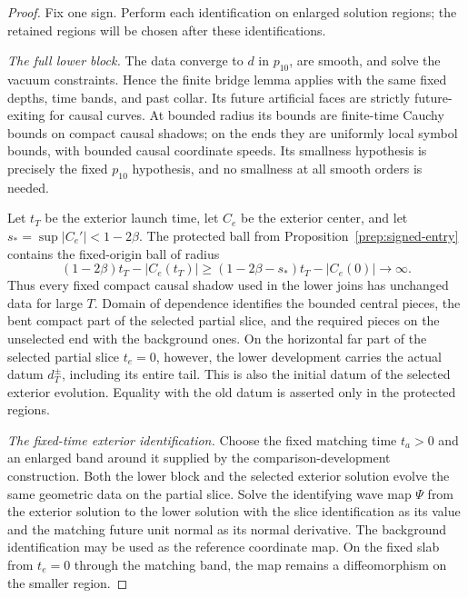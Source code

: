 \begin{proof}
Fix one sign. Perform each identification on enlarged solution regions;
the retained regions will be chosen after these identifications.

\emph{The full lower block.}
The data converge to $d$ in $p_{10}$, are smooth, and solve the
vacuum constraints. Hence the finite bridge lemma applies with the
same fixed depths, time bands, and past collar. Its future artificial
faces are strictly future-exiting for causal curves. At bounded
radius its bounds are finite-time Cauchy bounds on compact causal
shadows; on the ends they are uniformly local symbol bounds, with
bounded causal coordinate speeds. Its smallness hypothesis is precisely
the fixed $p_{10}$ hypothesis, and no smallness at all smooth orders
is needed.

Let $t_T$ be the exterior launch time, let $C_e$ be the exterior
center, and let $s_* =\sup|C_e'|<1-2\beta$. The protected ball from
Proposition~\ref{prep:signed-entry} contains the fixed-origin ball
of radius
\begin{equation}\label{attach:protected-radius}
 (1-2\beta)t_T-|C_e(t_T)|
 \ge (1-2\beta-s_*)t_T-|C_e(0)|\longrightarrow\infty.
\end{equation}
Thus every fixed compact causal shadow used in the lower joins has
unchanged data for large $T$. Domain of dependence identifies the
bounded central pieces, the bent compact part of the selected
partial slice, and the required pieces on the unselected end with
the background ones. On the horizontal far part of the selected
partial slice $t_e=0$, however, the lower development carries the
actual datum $d_T^\pm$, including its entire tail. This is also the
initial datum of the selected exterior evolution. Equality with the
old datum is asserted only in the protected regions.

\emph{The fixed-time exterior identification.}
Choose the fixed matching time $t_a>0$ and an enlarged band around
it supplied by the comparison-development construction. Both the
lower block and the selected exterior solution evolve the same
geometric data on the partial slice. Solve the identifying wave map $\Psi$
from the exterior solution to the lower solution with the slice
identification as its value and the matching future unit normal as
its normal derivative. The background identification may be used as
the reference coordinate map. On the fixed slab from $t_e=0$ through
the matching band, the map remains a diffeomorphism on the smaller
region.


\end{proof}
